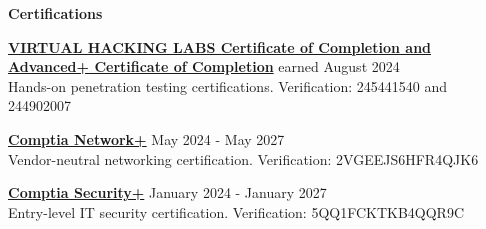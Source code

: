 \documentclass[12pt]{article}
\begin{document}

\vspace{0.2in} %

\begin{center}
	{\noindent \bfseries Certifications} \\[0.15in]   
\end{center}

\vspace{0.1pt}

\noindent
{\bfseries \href{https://drive.proton.me/urls/WQCXTSR8C0#8HdkpbN5AP9T}{VIRTUAL HACKING LABS Certificate of Completion \newline and Advanced+ Certificate of Completion}} \hfill earned August 2024 \\[0.04in]
\noindent Hands-on penetration testing certifications. \hfill Verification: 245441540 and 244902007
\noindent

\vspace{0.1in}

\noindent
    {\bfseries \href{https://www.credly.com/badges/26299a0a-52db-411c-9df8-f182ff93b8f1/public_url}{Comptia Network+}} \hfill May 2024 - May 2027 \\[0.04in]
    \noindent Vendor-neutral networking certification. \hfill Verification: 2VGEEJS6HFR4QJK6
\noindent

\vspace{0.1in}

\noindent
    {\bfseries \href{https://www.credly.com/badges/2c28f48a-77e5-4b3d-b38e-2b2e355a7eec/public_url}{Comptia Security+}} \hfill January 2024 - January 2027 \\[0.04in]
    \noindent Entry-level IT security certification. \hfill Verification: 5QQ1FCKTKB4QQR9C
\noindent


\end{document}

